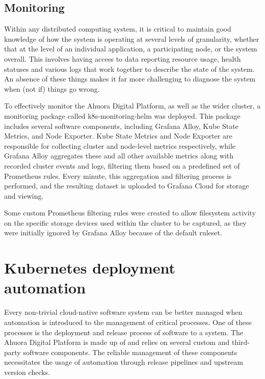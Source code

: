 
\subsection{Monitoring} \label{section:monitoring-implementation}

Within any distributed computing system, it is critical to maintain good knowledge of how the system is operating at several levels of granularity, whether that at the level of an individual application, a participating node, or the system overall. This involves having access to data reporting resource usage, health statuses and various logs that work together to describe the state of the system. An absence of these things makes it far more challenging to diagnose the system when (not if) things go wrong.

To effectively monitor the Ahuora Digital Platform, as well as the wider cluster, a monitoring package called k8s-monitoring-helm was deployed. This package includes several software components, including Grafana Alloy, Kube State Metrics, and Node Exporter. Kube State Metrics and Node Exporter are responsible for collecting cluster and node-level metrics respectively, while Grafana Alloy aggregates these and all other available metrics along with recorded cluster events and logs, filtering them based on a predefined set of Prometheus rules. Every minute, this aggregation and filtering process is performed, and the resulting dataset is uploaded to Grafana Cloud for storage and viewing.

Some custom Prometheus filtering rules were created to allow filesystem activity on the specific storage devices used within the cluster to be captured, as they were initially ignored by Grafana Alloy because of the default ruleset.


\section{Kubernetes deployment automation}

Every non-trivial cloud-native software system can be better managed when automation is introduced to the management of critical processes. One of these processes is the deployment and release process of software to a system. The Ahuora Digital Platform is made up of and relies on several custom and third-party software components. The reliable management of these components necessitates the usage of automation through release pipelines and upstream version checks.

